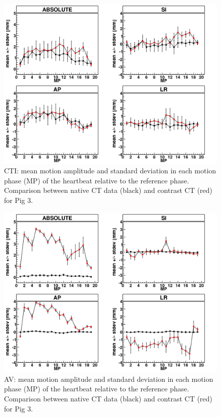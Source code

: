 \documentclass[type=dr, dr=rernat, accentcolor=tud7b,colorbacktitle, bigchapter, openright, twoside, 12pt ]{tudthesis}
\begin{document}
\vspace*{-0.8cm}

\begin{figure}[H]
\begin{center}
 \includegraphics[scale=0.22]{Mayo_CTI_HB_NATIV_VS_CONTRAST.png}
\caption{CTI: mean motion amplitude and standard deviation in each motion phase (MP) of the heartbeat relative to the reference phase. 
Comparison between native CT data (black) and contrast CT (red) for Pig 3.}
\label{motion_hb_cti_contrast_native}
\end{center}
\end{figure}

\newpage


\begin{figure}[H]
\begin{center}
 \includegraphics[scale=0.22]{Mayo_AV_HB_NATIV_VS_CONTRAST.png}
\caption{AV: mean motion amplitude and standard deviation in each motion phase (MP) of the heartbeat relative to the reference phase. 
Comparison between native CT data (black) and contrast CT (red) for Pig 3.}
\label{motion_hb_av_contrast_native}
\end{center}
\end{figure}
\end{document}
